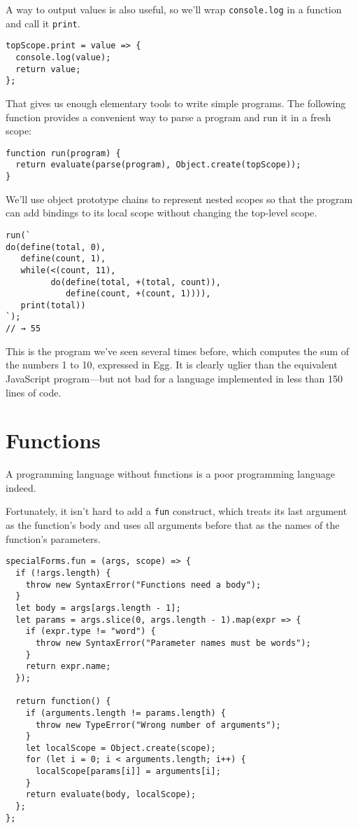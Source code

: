 A way to output values is also useful, so we'll wrap \lstinline`console.log` in a function and call it \lstinline`print`.

\begin{lstlisting}
topScope.print = value => {
  console.log(value);
  return value;
};
\end{lstlisting}
\noindent{}

That gives us enough elementary tools to write simple programs. The following function provides a convenient way to parse a program and run it in a fresh scope:

\begin{lstlisting}
function run(program) {
  return evaluate(parse(program), Object.create(topScope));
}
\end{lstlisting}
\noindent{}

We'll use object prototype chains to represent nested scopes so that the program can add bindings to its local scope without changing the top-level scope.

\begin{lstlisting}
run(`
do(define(total, 0),
   define(count, 1),
   while(<(count, 11),
         do(define(total, +(total, count)),
            define(count, +(count, 1)))),
   print(total))
`);
// → 55
\end{lstlisting}
\noindent{}

This is the program we've seen several times before, which computes the sum of the numbers 1 to 10, expressed in Egg. It is clearly uglier than the equivalent JavaScript program—but not bad for a language implemented in less than 150 lines of code.

\label{language.egg_fun}\section{Functions}

A programming language without functions is a poor programming language indeed.

Fortunately, it isn't hard to add a \lstinline`fun` construct, which treats its last argument as the function's body and uses all arguments before that as the names of the function's parameters.

\begin{lstlisting}
specialForms.fun = (args, scope) => {
  if (!args.length) {
    throw new SyntaxError("Functions need a body");
  }
  let body = args[args.length - 1];
  let params = args.slice(0, args.length - 1).map(expr => {
    if (expr.type != "word") {
      throw new SyntaxError("Parameter names must be words");
    }
    return expr.name;
  });

  return function() {
    if (arguments.length != params.length) {
      throw new TypeError("Wrong number of arguments");
    }
    let localScope = Object.create(scope);
    for (let i = 0; i < arguments.length; i++) {
      localScope[params[i]] = arguments[i];
    }
    return evaluate(body, localScope);
  };
};
\end{lstlisting}
\noindent{}

